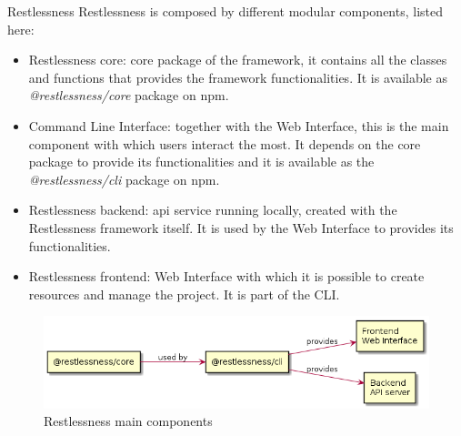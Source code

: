 \begin{chapter}{Restlessness}
    Restlessness is composed by different modular components, listed here:
    \begin{itemize}
        \item Restlessness core: core package of the framework, it contains all the
            classes and functions that provides the framework functionalities. It is
            available as \mbox{\textit{@restlessness/core}} package on npm.
        \item Command Line Interface: together with the Web Interface, this is the
            main component with which users interact the most. It depends on the
            core package to provide its functionalities and it is available as
            the \mbox{\textit{@restlessness/cli}} package on npm.
        \item Restlessness backend: api service running locally, created with the
            Restlessness framework itself. It is used by the Web Interface to
            provides its functionalities.
        \item Restlessness frontend: Web Interface with which it is possible to
            create resources and manage the project. It is part of the CLI.
    \end{itemize}
    \begin{figure}
        \centering
        \includegraphics[width=\linewidth]{source/diagrams/rln_components.png}
        \caption{Restlessness main components}
    \end{figure}


\end{chapter}
